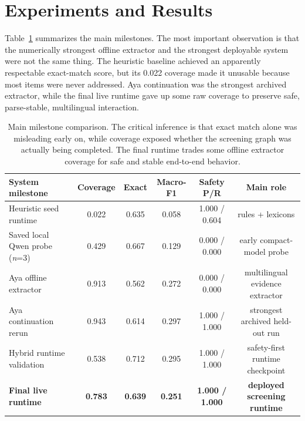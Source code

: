 \documentclass[11pt]{article}
\begin{document}
\section{Experiments and Results}
Table~\ref{tab:results} summarizes the main milestones. The most important observation is that the numerically strongest offline extractor and the strongest deployable system were not the same thing. The heuristic baseline achieved an apparently respectable exact-match score, but its 0.022 coverage made it unusable because most items were never addressed. Aya continuation was the strongest archived extractor, while the final live runtime gave up some raw coverage to preserve safe, parse-stable, multilingual interaction.

\begin{table}[t]
\centering
\small
\setlength{\tabcolsep}{5pt}
\begin{tabular}{lccccc}
\toprule
System milestone & Coverage & Exact & Macro-F1 & Safety P/R & Main role \\
\midrule
Heuristic seed runtime & 0.022 & 0.635 & 0.058 & 1.000 / 0.604 & rules + lexicons \\
Saved local Qwen probe (\textit{n}=3) & 0.429 & 0.667 & 0.129 & 0.000 / 0.000 & early compact-model probe \\
Aya offline extractor & 0.913 & 0.562 & 0.272 & 0.000 / 0.000 & multilingual evidence extractor \\
Aya continuation rerun & 0.943 & 0.614 & 0.297 & 1.000 / 1.000 & strongest archived held-out run \\
Hybrid runtime validation & 0.538 & 0.712 & 0.295 & 1.000 / 1.000 & safety-first runtime checkpoint \\
\textbf{Final live runtime} & \textbf{0.783} & \textbf{0.639} & \textbf{0.251} & \textbf{1.000 / 1.000} & \textbf{deployed screening runtime} \\
\bottomrule
\end{tabular}
\caption{Main milestone comparison. The critical inference is that exact match alone was misleading early on, while coverage exposed whether the screening graph was actually being completed. The final runtime trades some offline extractor coverage for safe and stable end-to-end behavior.}
\label{tab:results}
\end{table}
\end{document}
